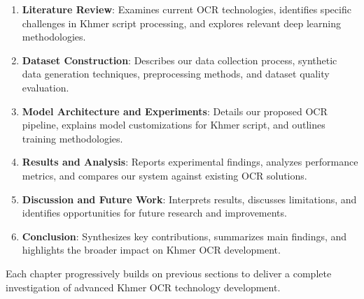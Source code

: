 {\begin{enumerate}
   \item \textbf{Literature Review}: Examines current OCR technologies, identifies specific challenges in Khmer script processing, and explores relevant deep learning methodologies.
   
   \item \textbf{Dataset Construction}: Describes our data collection process, synthetic data generation techniques, preprocessing methods, and dataset quality evaluation.
   
   \item \textbf{Model Architecture and Experiments}: Details our proposed OCR pipeline, explains model customizations for Khmer script, and outlines training methodologies.
   
   \item \textbf{Results and Analysis}: Reports experimental findings, analyzes performance metrics, and compares our system against existing OCR solutions.
   
   \item \textbf{Discussion and Future Work}: Interprets results, discusses limitations, and identifies opportunities for future research and improvements.
   
   \item \textbf{Conclusion}: Synthesizes key contributions, summarizes main findings, and highlights the broader impact on Khmer OCR development.
\end{enumerate}

Each chapter progressively builds on previous sections to deliver a complete investigation of advanced Khmer OCR technology development.

}
